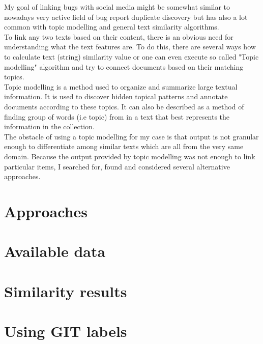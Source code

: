 My goal of linking bugs with social media might be somewhat similar to nowadays very active field of bug report duplicate discovery but has also a lot common with topic modelling and general text similarity algorithms.\\
To link any two texts based on their content, there is an obvious need for understanding what the text features are. 
To do this, there are several ways how to calculate text (string) similarity value or one can even execute so called "Topic modelling" algorithm and try to connect documents based on their matching topics.\\
Topic modelling is a method used to organize and summarize large textual information. It is used to discover hidden topical patterns and annotate documents according to these topics. It can also be described as a method of finding group of words (i.e topic) from in a text that best represents the information in the collection.\\
The obstacle of using a topic modelling for my case is that output is not granular enough to differentiate among similar texts which are all from the very same domain. Because the output provided by topic modelling was not enough to link particular items, I searched for, found and considered several alternative approaches.

\section{Approaches}
\label{sec:pairingApproaches}


\section{Available data}


\section{Similarity results}
\label{sec:similarityResults}


\section{Using GIT labels}

